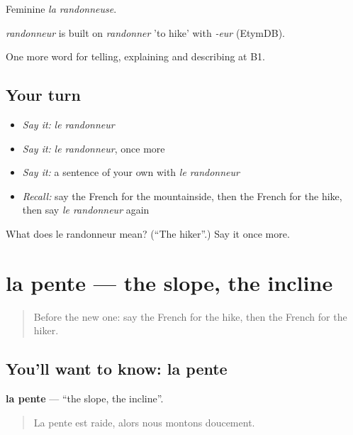 Feminine \emph{la randonneuse}.

\begin{cousinweb}
\emph{randonneur} is built on \emph{randonner} 'to hike' with \emph{-eur} (EtymDB).
\end{cousinweb}

\begin{grammarlens}[title={What you've built}]
One more word for telling, explaining and describing at B1.
\end{grammarlens}

\subsection*{Your turn}
\begin{itemize}
\raggedright
  \item \emph{Say it:} \emph{le randonneur}
  \item \emph{Say it:} \emph{le randonneur}, once more
  \item \emph{Say it:} a sentence of your own with \emph{le randonneur}
  \item \emph{Recall:} say the French for the mountainside, then the French for the hike, then say \emph{le randonneur} again
\end{itemize}

\begin{tcolorbox}[breakable,colback=teal!4,colframe=teal!35!black,title={Before you move on}]
What does le randonneur mean? (\textquotedblleft{}The hiker\textquotedblright{}.) Say it once more.
\end{tcolorbox}
\section[la pente]{la pente — the slope, the incline}

\label{lesson:FR-C455-pente}



\begin{quote}
Before the new one: say the French for the hike, then the French for the hiker.
\end{quote}

\subsection*{You'll want to know: la pente}
\textbf{la pente} — \textquotedblleft{}the slope, the incline\textquotedblright{}.

\begin{quote}
La pente est raide, alors nous montons doucement.
\end{quote}

